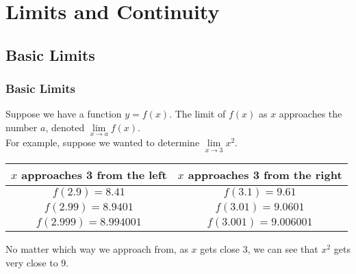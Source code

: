 \part{Limits and Continuity}

\chapter{Basic Limits}

\section{Basic Limits}

Suppose we have a function $ y = f(x) $. The limit of $ f(x) $ as $ x $ approaches the number $ a $, denoted $ \lim\limits_{x \rightarrow a}f(x) $. \\

For example, suppose we wanted to determine $ \lim\limits_{x \rightarrow 3}x^2 $. \\

\begin{table}[H]
	\centering
	\begin{tabular}{|c|c|} \hline
		\textbf{$ x $ approaches 3 from the left} & \textbf{$ x $ approaches 3 from the right} \\ \hline
		$ f(2.9) = 8.41 $                         & $ f(3.1) = 9.61 $                          \\ \hline
		$ f(2.99) = 8.9401 $                      & $ f(3.01) = 9.0601 $                       \\ \hline
		$ f(2.999) = 8.994001 $                   & $ f(3.001) = 9.006001 $                    \\ \hline
	\end{tabular}
\end{table}

No matter which way we approach from, as $ x $ gets close 3, we can see that $ x^2 $ gets very close to 9. \\

